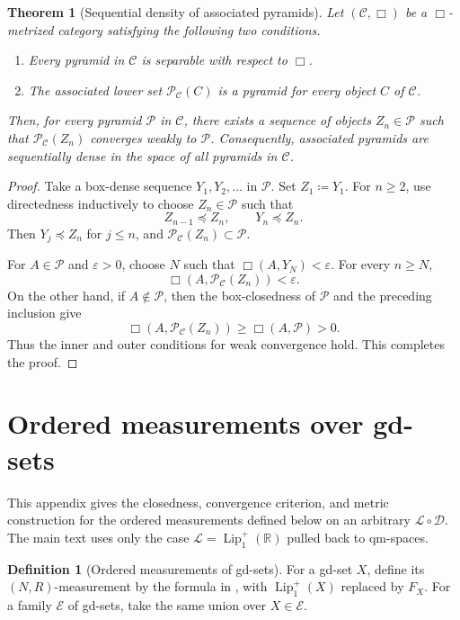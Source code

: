 \documentclass{amsart}
\theoremstyle{plain}
\newtheorem{theorem}{Theorem}[section]
\theoremstyle{definition}
\newtheorem*{definition*}{Definition}
\theoremstyle{remark}
\newcommand{\R}{\mathbb{R}}
\newcommand{\D}{\mathcal{D}}
\renewcommand{\L}{\mathcal{L}}
\newcommand{\Lup}{\operatorname{Lip}^{+}_{1}(\R)}
\newcommand{\lipplus}{\operatorname{Lip}^{+}_{1}}
\begin{document}
\begin{theorem}[Sequential density of associated pyramids]
\label{thm:associated-pyramid-sequential-density}
Let $(\mathcal C,\Box)$ be a $\Box$-metrized category satisfying the following two conditions.
\begin{enumerate}[label=\textup{(\roman*)}]
\item Every pyramid in $\mathcal C$ is separable with respect to $\Box$.
\item The associated lower set $\mathcal P_{\mathcal C}(C)$ is a pyramid for every object $C$ of $\mathcal C$.
\end{enumerate}
Then, for every pyramid $\mathcal P$ in $\mathcal C$, there exists a sequence of objects $Z_n\in\mathcal P$ such that $\mathcal P_{\mathcal C}(Z_n)$ converges weakly to $\mathcal P$. Consequently, associated pyramids are sequentially dense in the space of all pyramids in $\mathcal C$.
\end{theorem}

\begin{proof}
Take a box-dense sequence $Y_1,Y_2,\ldots$ in $\mathcal P$. Set $Z_1\coloneqq Y_1$. For $n\geq2$, use directedness inductively to choose $Z_n\in\mathcal P$ such that
\[Z_{n-1}\preceq Z_n,\qquad Y_n\preceq Z_n.\]
Then $Y_j\preceq Z_n$ for $j\leq n$, and $\mathcal P_{\mathcal C}(Z_n)\subset\mathcal P$.

For $A\in\mathcal P$ and $\varepsilon>0$, choose $N$ such that $\Box(A,Y_N)<\varepsilon$. For every $n\geq N$,
\[\Box(A,\mathcal P_{\mathcal C}(Z_n))<\varepsilon.\]
On the other hand, if $A\notin\mathcal P$, then the box-closedness of $\mathcal P$ and the preceding inclusion give
\[\Box(A,\mathcal P_{\mathcal C}(Z_n))\geq\Box(A,\mathcal P)>0.\]
Thus the inner and outer conditions for weak convergence hold.
This completes the proof.
\end{proof}

\section{Ordered measurements over gd-sets}
\label{sec:appendix-ordered-measurements}

This appendix gives the closedness, convergence criterion, and metric construction for the ordered measurements defined below on an arbitrary $\L\circ\D$. The main text uses only the case $\L=\Lup$ pulled back to qm-spaces.

\begin{definition*}[Ordered measurements of gd-sets]
For a gd-set $X$, define its $(N,R)$-measurement by the formula in , with $\lipplus(X)$ replaced by $F_X$. For a family $\mathcal E$ of gd-sets, take the same union over $X\in\mathcal E$.
\end{definition*}
\end{document}
